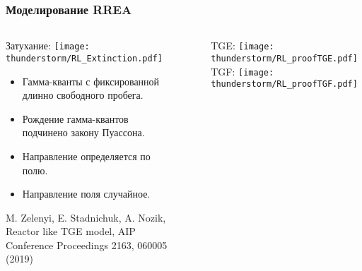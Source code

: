 \begin{frame}
\frametitle{Моделирование RREA}
\begin{columns}
    \begin{column}{0.5\textwidth}
        Затухание:
        \texttt{[image: thunderstorm/RL\_Extinction.pdf]}
 {\footnotesize \begin{itemize}
            \item Гамма-кванты с фиксированной длинно свободного пробега.
            \item Рождение гамма-квантов подчинено закону Пуассона.
            \item Направление определяется по полю.
            \item Направление поля случайное.
        \end{itemize}}
    \tiny{M. Zelenyi, E. Stadnichuk, A. Nozik, Reactor like TGE model, AIP Conference Proceedings 2163, 060005 (2019)}
    
    \end{column}
    \vline~
    \begin{column}{0.5\textwidth} 
        TGE:
        \texttt{[image: thunderstorm/RL\_proofTGE.pdf]}
        TGF:
        \texttt{[image: thunderstorm/RL\_proofTGF.pdf]}
    \end{column}
\end{columns}  
\end{frame}



%
%
%


